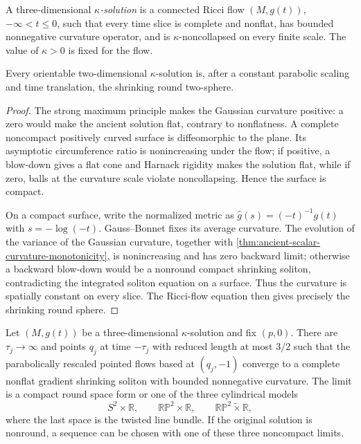 \begin{definition}
\label{def:kappa-solution}
\notready
A three-dimensional \emph{$\kappa$-solution} is a connected Ricci flow
$(M,g(t))$, $-\infty<t\le0$, such that every time slice is complete and
nonflat, has bounded nonnegative curvature operator, and is
$\kappa$-noncollapsed on every finite scale.  The value of $\kappa>0$ is
fixed for the flow.
\end{definition}

\begin{theorem}
\label{thm:two-dimensional-kappa-solutions-round}
\notready
Every orientable two-dimensional $\kappa$-solution is, after a constant
parabolic scaling and time translation, the shrinking round two-sphere.
\end{theorem}

\begin{proof}
The strong maximum principle makes the Gaussian curvature positive: a zero
would make the ancient solution flat, contrary to nonflatness.  A complete
noncompact positively curved surface is diffeomorphic to the plane.  Its
asymptotic circumference ratio is nonincreasing under the flow; if positive,
a blow-down gives a flat cone and Harnack rigidity makes the solution flat,
while if zero, balls at the curvature scale violate noncollapsing.  Hence the
surface is compact.

On a compact surface, write the normalized metric as
$\widehat g(s)=(-t)^{-1}g(t)$ with $s=-\log(-t)$.  Gauss--Bonnet fixes its
average curvature.  The evolution of the variance of the Gaussian curvature,
together with \ref{thm:ancient-scalar-curvature-monotonicity}, is
nonincreasing and has zero backward limit; otherwise a backward blow-down
would be a nonround compact shrinking soliton, contradicting the integrated
soliton equation on a surface.  Thus the curvature is spatially constant on
every slice.  The Ricci-flow equation then gives precisely the shrinking
round sphere.
\end{proof}

\begin{theorem}
\label{thm:kappa-solution-asymptotic-models}
\notready
Let $(M,g(t))$ be a three-dimensional $\kappa$-solution and fix $(p,0)$.
There are $\tau_j\to\infty$ and points $q_j$ at time $-\tau_j$ with reduced
length at most $3/2$ such that the parabolically rescaled pointed flows based
at $(q_j,-1)$ converge to a complete nonflat gradient shrinking soliton with
bounded nonnegative curvature.  The limit is a compact round space form or
one of the three cylindrical models
\[
 S^2\times\mathbb R,\qquad
 \mathbb{RP}^2\times\mathbb R,\qquad
 \mathbb{RP}^2\widetilde\times\mathbb R,
\]
where the last space is the twisted line bundle.  If the original solution
is nonround, a sequence can be chosen with one of these three noncompact
limits.
\end{theorem}

